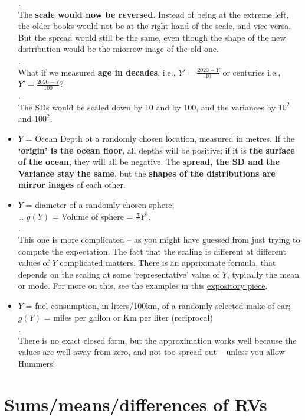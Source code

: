 \documentclass[]{book}
\begin{document}
\begin{itemize}
  .\\
  The \textbf{scale would now be reversed}. Instead of being at the extreme left, the older books would not be at the right hand of the scale, and vice versa. But the spread would still be the same, even though the shape of the new distribution would be the miorrow inage of the old one.\\
  .\\
  What if we measured \textbf{age in decades}, i.e., \(Y' = \frac{2020 - Y}{10}\) or centuries i.e., \(Y' = \frac{2020 - Y}{100}\)?\\
  .\\
  The SDs would be scaled down by 10 and by 100, and the variances by \(10^2\) and \(100^2.\)
\item
  \(Y\) = Ocean Depth ot a randomly chosen location, measured in metres. If the \textbf{`origin' is the ocean floor}, all depths will be positive; if it is \textbf{the surface of the ocean}, they will all be negative. The \textbf{spread, the SD and the Variance stay the same}, but the \textbf{shapes of the distributions are mirror inages} of each other.
\item
  \(Y\) = diameter of a randomly chosen sphere;\\
  \ldots{} \(g(Y)\) = Volume of sphere = \(\frac{\pi}{6} Y^3.\)\\
  .\\
  This one is more complicated -- as you might have guessed from just trying to compute the expectation. The fact that the scaling is different at different values of \(Y\) complicated matters. There is an appriximate formula, that depends on the scaling at some `representative' value of \(Y\), typically the mean or mode. For more on this, see the examples in this \href{http://www.medicine.mcgill.ca/epidemiology/hanley/Reprints/jh_dt_tas_2006.pdf}{expository piece}.
\item
  \(Y\) = fuel consumption, in liters/100km, of a randomly selected make of car;\\
  \(g(Y)\) = miles per gallon or Km per liter (reciprocal)\\
  .\\
  There is no exact closed form, but the approximation works well because the values are well away from zero, and not too spread out -- unless you allow Hummers!
\end{itemize}

\hypertarget{sumsmeansdifferences-of-rvs}{%
\section{Sums/means/differences of RVs}\label{sumsmeansdifferences-of-rvs}}
\end{document}
